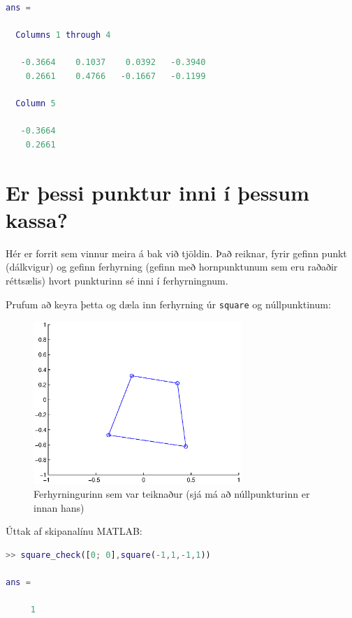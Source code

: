 \documentclass[a4]{article}
\begin{document}
\begin{lstlisting}[language=Matlab]
ans =

  Columns 1 through 4

   -0.3664    0.1037    0.0392   -0.3940
    0.2661    0.4766   -0.1667   -0.1199

  Column 5

   -0.3664
    0.2661
\end{lstlisting}


\section{Er þessi punktur inni í þessum kassa?}

Hér er forrit sem vinnur meira á bak við tjöldin. Það reiknar, fyrir gefinn punkt (dálkvigur) og gefinn ferhyrning (gefinn með hornpunktunum sem eru raðaðir réttsælis) hvort punkturinn sé inni í ferhyrningnum.



Prufum að keyra þetta og dæla inn ferhyrning úr \lstinline{square} og núllpunktinum:

\begin{figure}[h!]
\centering
\includegraphics[width=0.7\textwidth]{sqchdaemi.eps}
\caption{Ferhyrningurinn sem var teiknaður (sjá má að núllpunkturinn er innan hans)}
\end{figure}

Úttak af skipanalínu MATLAB:

\begin{lstlisting}[language=Matlab]
>> square_check([0; 0],square(-1,1,-1,1))

ans =

     1
\end{lstlisting}
\end{document}
